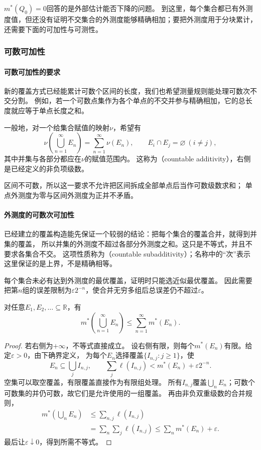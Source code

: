 $m^*(Q_0)=0$回答的是外部估计能否下降的问题。
到这里，每个集合都已有外测度值，但还没有证明不交集合的外测度能够精确相加；要把外测度用于分块累计，还需要下面的可加性与可测性。

\subsubsection{可数可加性}

\paragraph{可数可加性的要求}

新的覆盖方式已经能累计可数个区间的长度，我们也希望测量规则能处理可数次不交分割。
例如，若一个可数点集作为各个单点的不交并参与精确相加，它的总长度就应等于单点长度之和。

一般地，对一个给集合赋值的映射$\nu$，希望有
\[
 \nu\left(\bigcup_{n=1}^{\infty}E_n\right)=\sum_{n=1}^{\infty}\nu(E_n),
 \qquad E_i\cap E_j=\varnothing\ (i\neq j),
\]
其中并集与各部分都应在$\nu$的赋值范围内。
这称为（countable additivity），右侧是已经定义的非负项级数。

区间不可数，所以这一要求不允许把区间拆成全部单点后当作可数级数求和；
单点外测度为零与区间外测度为正并不矛盾。

\paragraph{外测度的可数次可加性}

已经建立的覆盖构造能先保证一个较弱的结论：把每个集合的覆盖合并，就得到并集的覆盖，
所以并集的外测度不超过各部分外测度之和。这只是不等式，并且不要求各集合不交。
这项性质称为（countable subadditivity）；名称中的“次”表示这里保证的是上界，不是精确相等。

每个集合未必有达到外测度的最优覆盖，证明时只能选近似最优覆盖。
因此需要把第$n$组的误差限制为$\varepsilon2^{-n}$，使合并无穷多组后总误差仍不超过$\varepsilon$。
\begin{theorem}[勒贝格外测度的可数次可加性]
\label{thm:analysis-outer-subadditivity}
对任意$E_1,E_2,\ldots\subseteq\mathbb R$，有
\begin{equation}
 m^*\left(\bigcup_{n=1}^{\infty}E_n\right)
 \leq\sum_{n=1}^{\infty}m^*(E_n).
 \label{eq:analysis-outer-subadditivity}
\end{equation}
\end{theorem}
\begin{proof}
若右侧为$+\infty$，不等式直接成立。
设右侧有限，则每个$m^*(E_n)$有限。给定$\varepsilon>0$，由下确界定义，
为每个$E_n$选择覆盖$\{I_{n,j}:j\geq1\}$，使
\[
 E_n\subseteq\bigcup_j I_{n,j},\qquad
 \sum_j\ell(I_{n,j})<m^*(E_n)+\varepsilon2^{-n}.
\]
空集可以取空覆盖，有限覆盖直接作为有限组处理。
所有$I_{n,j}$覆盖$\bigcup_nE_n$；可数个可数集的并仍可数，故它们是允许使用的一组覆盖。
再由非负双重级数的合并规则，
\[
 \begin{aligned}
 m^*\left(\bigcup_nE_n\right)
 &\leq\sum_{n,j}\ell(I_{n,j})\\
 &=\sum_n\sum_j\ell(I_{n,j})
 \leq\sum_nm^*(E_n)+\varepsilon.
 \end{aligned}
\]
最后让$\varepsilon\downarrow0$，得到所需不等式。
\end{proof}

